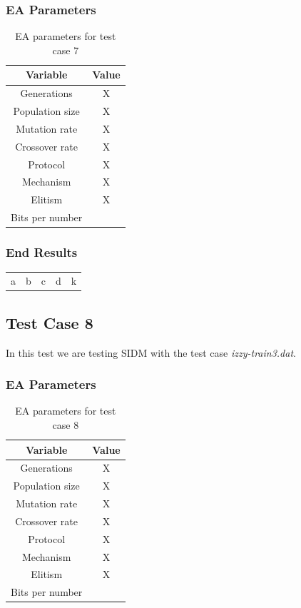 \subsubsection{EA Parameters}\label{sec:test-case-7-parameters}
\begin{table}
	\begin{tabular}{c c}
		Variable & Value \\
		\hline
		Generations & X \\
		\hline
		Population size & X \\
		\hline
		Mutation rate & X \\
		\hline
		Crossover rate & X \\
		\hline
		Protocol & X \\
		\hline
		Mechanism & X \\
		\hline
		Elitism & X \\
		\hline
		Bits per number & \\
	\end{tabular}
	\caption{EA parameters for test case 7}
\end{table}
\subsubsection{End Results}\label{sec:test-case-7-results}
\begin{table}
	\begin{tabular}{c c c c c}
		a & b & c & d & k \\
	\end{tabular}
\end{table}

\subsection{Test Case 8}\label{sec:test-case-8}
In this test we are testing SIDM with the test case
\textit{izzy-train3.dat}.
\subsubsection{EA Parameters}\label{sec:test-case-8-parameters}
\begin{table}
	\begin{tabular}{c c}
		Variable & Value \\
		\hline
		Generations & X \\
		\hline
		Population size & X \\
		\hline
		Mutation rate & X \\
		\hline
		Crossover rate & X \\
		\hline
		Protocol & X \\
		\hline
		Mechanism & X \\
		\hline
		Elitism & X \\
		\hline
		Bits per number & \\
	\end{tabular}
	\caption{EA parameters for test case 8}
\end{table}

